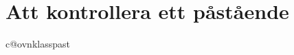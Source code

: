 
\chapter{Att kontrollera ett påstående}
\label{app:verifiera-ovning-klasser}

\ifcsname c@ovnklasspast\endcsname\else{}\fi
\newcommand{\ovnklasspast}{\stepcounter{ovnklasspast}\arabic{ovnklasspast}}

